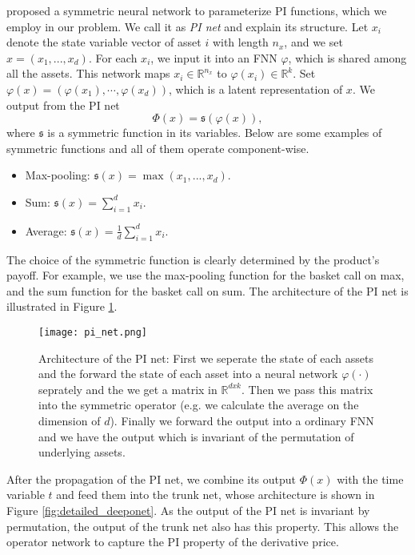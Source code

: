 \documentclass[11pt,a4paper]{article}
\theoremstyle{remark}
\begin{document}
	\cite{germain2022deepsets} proposed a symmetric neural network to parameterize PI functions, which we employ in our problem. We call it as \emph{PI net} and explain its structure. Let $x_i$ denote the state variable vector of asset $i$ with length $n_x$, and we set $x = (x_1,...,x_d)$. For each $x_i$, we input it into an FNN $\varphi$, which is shared among all the assets. This network maps $x_i\in\mathbb{R}^{n_x}$ to $\varphi(x_i)\in\mathbb{R}^k$. Set $\varphi(x)=(\varphi(x_1),\cdots,\varphi(x_d))$, which is a latent representation of $x$. We output from the PI net
	\begin{equation}
		\Phi(x)= \mathfrak{s}\left(\varphi\left(x\right)\right),
	\end{equation}
	where $\mathfrak{s}$ is a symmetric function in its variables. Below are some examples of symmetric functions and all of them operate component-wise. 
	\begin{itemize}
		\item Max-pooling: $\mathfrak{s}(x)=\max \left(x_1,...,x_d\right)$.
		\item Sum: $\mathfrak{s}(x)=\sum_{i=1}^d x_i$.
		\item Average: $ \mathfrak{s}(x)=\frac{1}{d}\sum_{i=1}^d x_i$.
	\end{itemize}
	The choice of the symmetric function is clearly determined by the product's payoff. For example,  we use the max-pooling function for the basket call on max, and the sum function for the basket call on sum. The architecture of the PI net is illustrated in Figure \ref{fig:sym}.
	  	\begin{figure}[h!]
	  	\centering
	  	\texttt{[image: pi\_net.png]}
	  	\caption{Architecture of the PI net: First we seperate the state of each assets and the forward the state of each asset into a neural network $\varphi(\cdot)$ seprately and the we get a matrix in $\mathbb{R}^{dxk}$. Then we pass this matrix into the symmetric operator (e.g. we calculate the average on the dimension of $d$). Finally we forward the output into a ordinary FNN and we have the output which is invariant of the permutation of underlying assets.}
	  	\label{fig:sym}
	  \end{figure}
	After the propagation of the PI net, we combine its output $\Phi(x)$ with the time variable $t$ and feed them into the trunk net, whose architecture is shown in Figure \ref{fig:detailed_deeponet}. As the output of the PI net is invariant by permutation, the output of the trunk net also has this property. This allows the operator network to capture the PI property of the derivative price. 
	
\end{document}
